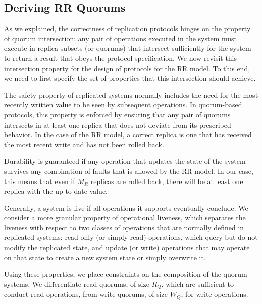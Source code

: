 \subsection{Deriving {\ac{RR} Quorums}}\label{ssec:parameters}

As we explained, the correctness of replication protocols hinges
on the property of quorum intersection: any pair of operations
executed in the system must execute in replica subsets (or
quorums) that intersect sufficiently for the system to return a
result that obeys the protocol specification. We now revisit this
intersection property for the design of protocols for the \ac{RR}
model. To this end, we need to first specify the set of
properties that this intersection should achieve.


\begin{property}[Freshness]
    The safety property of replicated systems normally includes
    the need for the most recently written value to be seen by
    subsequent operations. In quorum-based protocols, this
    property is enforced by ensuring that any pair of quorums
    intersects in at least one replica that does not deviate from
    its prescribed behavior. In the case of the \ac{RR} model, a
    correct replica is one that has received the most recent
    write and has not been rolled back.
\end{property}


\begin{property}[Durability]
    Durability is guaranteed if any operation that updates the
    state of the system survives any combination of faults that
    is allowed by the \ac{RR} model. In our case, this means that
    even if $M_R$ replicas are rolled back, there will be at
    least one replica with the up-to-date value.
\end{property}

\begin{property}
    Generally, a system is live if all operations it supports eventually
    conclude.  We consider a more granular property of operational
    liveness, which separates the liveness with respect to two classes
    of operations that are normally defined in replicated systems:
    read-only (or simply read) operations, which query but do not modify
    the replicated state, and update (or write) operations that may
    operate on that state to create a new system state or simply overwrite
    it.
\end{property}

Using these properties, we place constraints on the composition
of the quorum systems. We differentiate read quorums, of size
$R_Q$, which are sufficient to conduct read operations, from
write quorums, of size $W_Q$, for write operations.

